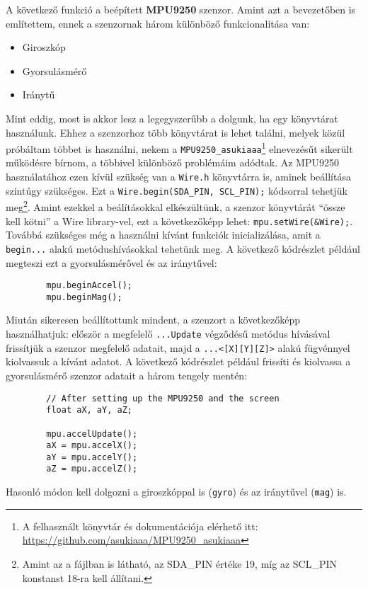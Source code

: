 \documentclass[12pt,a4paper]{article}
\begin{document}
      A következő funkció a beépített \textbf{MPU9250} szenzor. Amint azt a bevezetőben is említettem, ennek a szenzornak három különböző funkcionalitása van:
      \begin{itemize}
        \item Giroszkóp
        \item Gyorsulásmérő
        \item Iránytű
      \end{itemize}
      Mint eddig, most is akkor lesz a legegyszerűbb a dolgunk, ha egy könyvtárat használunk. Ehhez a szenzorhoz több könyvtárat is lehet találni, melyek közül próbáltam többet is használni, nekem a \texttt{MPU9250\_asukiaaa}\footnote{A felhasznált könyvtár és dokumentációja elérhető itt: \url{https://github.com/asukiaaa/MPU9250\_asukiaaa}} elnevezésűt sikerült működésre bírnom, a többivel különböző problémáim adódtak.
      Az MPU9250 használatához ezen kívül szükség van a \texttt{Wire.h} könyvtárra is, aminek beállítása szintúgy szükséges. Ezt a \texttt{Wire.begin(SDA\_PIN, SCL\_PIN);} kódsorral tehetjük meg\footnote{Amint az a fájlban is látható, az SDA\_PIN értéke 19, míg az SCL\_PIN konstanst 18-ra kell állítani.}. Amint ezekkel a beálításokkal elkészültünk, a szenzor könyvtárát ``össze kell kötni'' a Wire library-vel, ezt a következőképp lehet: \texttt{mpu.setWire(\&Wire);}. Továbbá szükséges még a használni kívánt funkciók inicializálása, amit a \texttt{begin...} alakú metódushívásokkal tehetünk meg. A következő kódrészlet például megteszi ezt a gyorsulásmérővel és az iránytűvel:
      \begin{lstlisting}
        mpu.beginAccel();
        mpu.beginMag();
      \end{lstlisting}
      Miután sikeresen beállítottunk mindent, a szenzort a következőképp használhatjuk: először a megfelelő \texttt{...Update} végződésű metódus hívásával frissítjük a szenzor megfelelő adatait, majd a \texttt{...<[X][Y][Z]>} alakú fügvénnyel kiolvassuk a kívánt adatot.
      A következő kódrészlet például frissíti és kiolvassa a gyorsulásmérő szenzor adatait a három tengely mentén:
      \begin{lstlisting}
        // After setting up the MPU9250 and the screen
        float aX, aY, aZ;

        mpu.accelUpdate();
        aX = mpu.accelX();
        aY = mpu.accelY();
        aZ = mpu.accelZ();
      \end{lstlisting}
      Hasonló módon kell dolgozni a giroszkóppal is (\texttt{gyro}) és az iránytűvel (\texttt{mag}) is.
\end{document}
